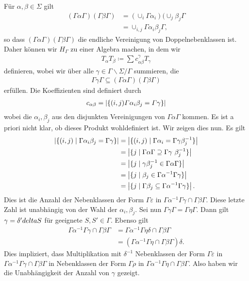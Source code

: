 Für $\alpha,\beta \in \Sigma$ gilt
\begin{align*}
(\Gamma \alpha \Gamma)(\Gamma \beta
\Gamma)&=(\cup_i \Gamma \alpha_i)(\cup_j \beta_j \Gamma\\
&=\cup_{i,j} \Gamma \alpha_i \beta_j \Gamma,
\end{align*}
so dass $(\Gamma \alpha \Gamma)(\Gamma \beta \Gamma)$
die endliche Vereinigung von Doppelnebenklassen ist.
Daher können wir $H_\Gamma$ zu einer Algebra machen, in dem wir
\begin{align*}
T_\alpha T_\beta \coloneqq \sum c_{\alpha \beta}^\gamma T_\gamma
\end{align*}
definieren, wobei wir über alle $\gamma \in \Gamma \backslash \Sigma /\Gamma$ summieren, die
\begin{align*}
\Gamma \gamma \Gamma \subseteq (\Gamma \alpha \Gamma)(\Gamma \beta
\Gamma)
\end{align*}
erfüllen.
Die Koeffizienten sind definiert durch
\begin{align*}
c_{\alpha\beta} =\left\vert\{(i,j)\mit \Gamma \alpha_i \beta_j=\Gamma \gamma\}\right\vert
\end{align*}
wobei die $\alpha_i,\beta_j$ aus den disjunkten Vereinigungen von $\Gamma \alpha \Gamma$ kommen.
Es ist a priori nicht klar, ob dieses Produkt wohldefiniert ist.
Wir zeigen dies nun. Es gilt
\begin{align*}
\abs{\{(i,j)\mid \Gamma \alpha_i \beta_j =\Gamma \gamma\}} &=\abs{\{(i,j)\mid \Gamma \alpha_i =\Gamma \gamma \beta_j^{-1}\}}\\
&=\abs{\{j\mid \Gamma \alpha \Gamma \supseteq \Gamma \gamma\ \beta_j^{-1}\}}\\
&=\abs{\{j \mid \gamma \beta_j^{-1} \in \Gamma \alpha \Gamma\}}\\
&=\abs{\{j \mid \beta_j \in \Gamma \alpha^{-1} \Gamma \gamma\}}\\
&=\abs{\{j \mid \Gamma \beta_j \subseteq \Gamma \alpha^{-1} \Gamma \gamma\}}.
\end{align*}
Dies ist die Anzahl der Nebenklassen der Form $\Gamma \varepsilon$ in $\Gamma \alpha^{-1} \Gamma \gamma \cap \Gamma \beta \Gamma$.
Diese letzte Zahl ist unabhängig von der Wahl der $\alpha_i,\beta_j$.
Sei nun $\Gamma \gamma\Gamma=\Gamma \eta \Gamma$.
Dann gilt $\gamma=\delta'\\delta S$ für geeignete $S,S'\in \Gamma$.
Ebenso gilt
\begin{align*}
\Gamma \alpha^{-1} \Gamma \gamma \cap \Gamma \beta \Gamma&=\Gamma \alpha^{-1} \Gamma \eta \delta \cap \Gamma\beta \Gamma\\
&=(\Gamma \alpha^{-1} \Gamma \eta \cap \Gamma \beta \Gamma)\delta.
\end{align*}
Dies impliziert, dass Multiplikation mit $\delta^{-1}$ Nebenklassen der Form $\Gamma \varepsilon$ in $\Gamma \alpha^{-1} \Gamma \gamma\cap \Gamma \beta \Gamma$ in Nebenklassen der Form $\Gamma \rho$ in $\Gamma \alpha^{-1}\Gamma \eta \cap \Gamma \beta \Gamma$.
Also haben wir die Unabhängigkeit der Anzahl von $\gamma$ gezeigt.


